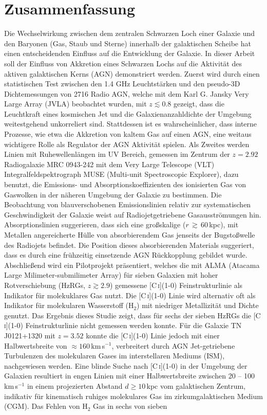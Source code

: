  
\chapter*{Zusammenfassung}
Die Wechselwirkung zwischen dem zentralen Schwarzen Loch einer Galaxie und den Baryonen (Gas, Staub und Sterne) innerhalb der galaktischen Scheibe hat einen entscheidenden Einfluss auf die Entwicklung der Galaxie. In dieser Arbeit soll der Einfluss von Akkretion eines Schwarzen Lochs auf die Aktivit\"at des aktiven galaktischen Kerns (AGN) demonstriert werden. Zuerst wird durch einen statistischen Test zwischen den 1.4 GHz Leuchtst\"arken und den pseudo-3D Dichtemessungen von 2716 Radio AGN, welche mit dem Karl G. Jansky Very Large Array (JVLA) beobachtet wurden, mit $z\lesssim0.8$ gezeigt, dass die Leuchtkraft eines kosmischen Jet und die Galaxienanzahldichte der Umgebung weitestgehend unkorreliert sind. Stattdessen ist es wahrscheinlicher, dass interne Prozesse, wie etwa die Akkretion von kaltem Gas auf einen AGN, eine weitaus wichtigere Rolle als Regulator der AGN Aktivit\"at spielen. Als Zweites werden Linien mit Ruhewellenl\"angen im UV Bereich, gemessen im Zentrum der $z=2.92$ Radiogalaxie MRC 0943-242 mit dem Very Large Telescope (VLT) Integralfeldspektrograph MUSE (Multi-unit Spectroscopic Explorer), dazu benutzt, die Emissions- und Absorptionskoeffizienten des ionisierten Gas von Gaswolken in der n\"aheren Umgebung der Galaxie zu bestimmen. Die Beobachtung von blauverschobenen Emissionslinien relativ zur systematischen Geschwindigkeit der Galaxie weist auf Radiojetgetriebene Gasausstr\"omungen hin. Absorptionslinien suggerieren, dass sich eine gro\ss skalige ($r\,\gtrsim\,60$\,kpc), mit Metallen angereicherte H\"ulle von absorbierendem Gas jenseits der Bugsto\ss welle des Radiojets befindet. Die Position dieses absorbierenden Materials suggeriert, dass es durch eine fr\"uhzeitig einsetzende AGN R\"uckkopplung gebildet wurde. Abschlie\ss end wird ein Pilotprojekt pr\"asentiert, welches die mit ALMA (Atacama Large Milimeter-submilimeter Array) f\"ur sieben Galaxien mit hoher Rotverschiebung (HzRGs, $z\gtrsim2.9$) gemessene [C\,\textsc{i}](1-0) Feinstrukturlinie als Indikator f\"ur molekuklares Gas nutzt. Die [C\,\textsc{i}](1-0) Linie wird alternativ oft als Indikator f\"ur molekularen Wasserstoff (H$_2$) mit niedriger Metallizit\"at und Dichte genutzt. Das Ergebnis dieses Studie zeigt, dass f\"ur sechs der sieben HzRGs die [C\,\textsc{i}](1-0) Feinstrukturlinie nicht gemessen werden konnte. F\"ur die Galaxie TN\,J0121+1320 mit $z=3.52$ konnte die [C\,\textsc{i}](1-0) Linie jedoch mit einer Halbwertsbreite von $\approx160$\,km\,s$^{-1}$, verbreitert durch AGN Jet-getriebene Turbulenzen des molekularen Gases im interstellaren Mediums (ISM), nachgewiesen werden. Eine blinde Suche nach [C\,\textsc{i}](1-0) in der Umgebung der Galaxien resultiert in engen Linien mit einer Halbwertsbreite zwischen 20 -- 100\,km\,s$^{-1}$ in einem projezierten Abstand $d\geq10$\,kpc vom galaktischen Zentrum, indikativ f\"ur kinematisch ruhiges molekulares Gas im zirkumgalaktischen Medium (CGM). Das Fehlen von H$_2$ Gas in sechs von sieben 